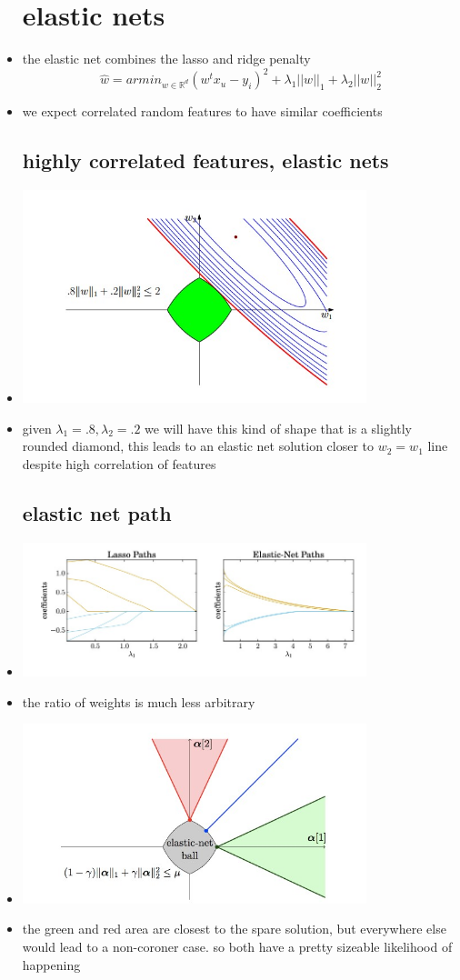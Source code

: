 \documentclass{article}
\begin{document}
\begin{itemize}
\section{elastic nets}
\item the elastic net combines the lasso and ridge penalty $$\hat{w}=armin_{w\in \mathbb{R}^{d}}(w^tx_u-y_i)^2+\lambda_1||w||_1+\lambda_2||w||_2^2$$
\item we expect correlated random features to have similar coefficients 
\subsection{highly correlated features, elastic nets }
\item \includegraphics[width=10cm]{labs/lab_3/images/r3_7.jpg}
    \item given $\lambda_1=.8,\lambda_2=.2$ we will have this kind of shape that is a slightly rounded diamond, this leads to an elastic net solution closer to $w_2=w_1$ line despite high correlation of features
\subsection{elastic net path}
\item \includegraphics[width=10cm]{labs/lab_3/images/r3_8.jpg}
\item the ratio of weights is much less arbitrary
\item \includegraphics[width=10cm]{labs/lab_3/images/r3_9.jpg}
\item the green and red area are closest to the spare solution, but everywhere else would lead to a non-coroner case. so both have a pretty sizeable likelihood of happening 

\end{itemize}
\end{document}

